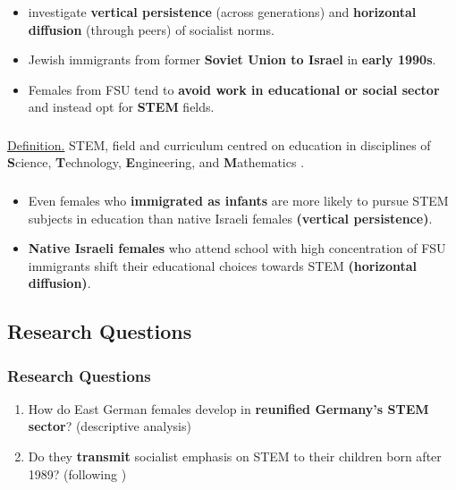 \documentclass[11pt, aspectratio=1610, xcolor={dvipsnames}]{beamer}
\newcommand{\highlight}[1]{\textbf{\textcolor{PineGreen}{#1}}}
\begin{document}
	\begin{frame}
		\frametitle{}
		
		\begin{itemize}
			\item \cite{FriedmanSokuler2020} investigate \highlight{vertical persistence} (across generations) and \highlight{horizontal diffusion} (through peers) of socialist norms.
			\item Jewish immigrants from former \highlight{Soviet Union to Israel} in \highlight{early 1990s}.
			\item Females from FSU tend to \highlight{avoid work in educational or social sector} and instead opt for \highlight{STEM} fields.
		\end{itemize}
		
	\end{frame}
	
	\begin{frame}
		\frametitle{}
		
		\textcolor{PineGreen}{\underline{Definition.}} STEM, field and curriculum centred on education in disciplines of \textbf{S}cience, \textbf{T}echnology, \textbf{E}ngineering, and \textbf{M}athematics \textcolor{darkgray}{\citep{Hallinen2024}}.
		
	\end{frame}
	
	\begin{frame}
		\frametitle{}
		
		\begin{itemize}
			\item Even females who \highlight{immigrated as infants} are more likely to pursue STEM subjects in education than native Israeli females \highlight{(vertical persistence)}.
			\item \highlight{Native Israeli females} who attend school with high concentration of FSU immigrants shift their educational choices towards STEM \highlight{(horizontal diffusion)}.
		\end{itemize}
		
	\end{frame}
	
	\subsection{Research Questions}
	\begin{frame}
		\frametitle{Research Questions}
		
		\begin{enumerate}
			\item How do East German females develop in \highlight{reunified Germany's STEM sector}? (descriptive analysis)
			\item Do they \highlight{transmit} socialist emphasis on STEM to their children born after 1989? (following \cite{Fernandez2011})
		\end{enumerate}
		
	\end{frame}
	
\end{document}
